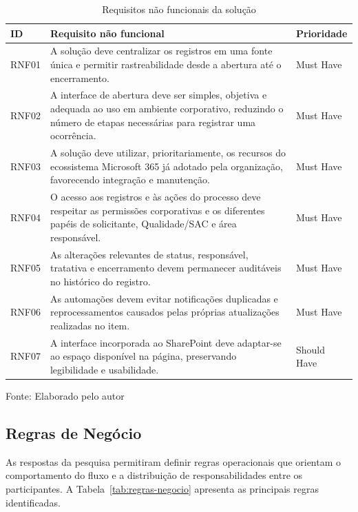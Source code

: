 \begin{table}[H]
\caption{Requisitos não funcionais da solução}
\label{tab:requisitos-nao-funcionais}
\centering
\begin{tabular}{p{1.1cm} p{8.5cm} p{2.4cm}}
\hline
\textbf{ID} & \textbf{Requisito não funcional} &
\textbf{Prioridade} \\
\hline
RNF01 & A solução deve centralizar os registros em uma fonte
única e permitir rastreabilidade desde a abertura até o
encerramento. & Must Have \\
\hline
RNF02 & A interface de abertura deve ser simples, objetiva e
adequada ao uso em ambiente corporativo, reduzindo o número
de etapas necessárias para registrar uma ocorrência. &
Must Have \\
\hline
RNF03 & A solução deve utilizar, prioritariamente, os
recursos do ecossistema Microsoft 365 já adotado pela
organização, favorecendo integração e manutenção. &
Must Have \\
\hline
RNF04 & O acesso aos registros e às ações do processo deve
respeitar as permissões corporativas e os diferentes papéis
de solicitante, Qualidade/SAC e área responsável. &
Must Have \\
\hline
RNF05 & As alterações relevantes de status, responsável,
tratativa e encerramento devem permanecer auditáveis no
histórico do registro. & Must Have \\
\hline
RNF06 & As automações devem evitar notificações duplicadas e
reprocessamentos causados pelas próprias atualizações
realizadas no item. & Must Have \\
\hline
RNF07 & A interface incorporada ao SharePoint deve adaptar-se
ao espaço disponível na página, preservando legibilidade e
usabilidade. & Should Have \\
\hline
\end{tabular}
\raggedright
\par
{\fontsize{10}{12}\selectfont Fonte: Elaborado pelo autor}
\end{table}

\subsection{Regras de Negócio}

As respostas da pesquisa permitiram definir regras
operacionais que orientam o comportamento do fluxo e a
distribuição de responsabilidades entre os participantes.
A Tabela~\ref{tab:regras-negocio} apresenta as principais
regras identificadas.

